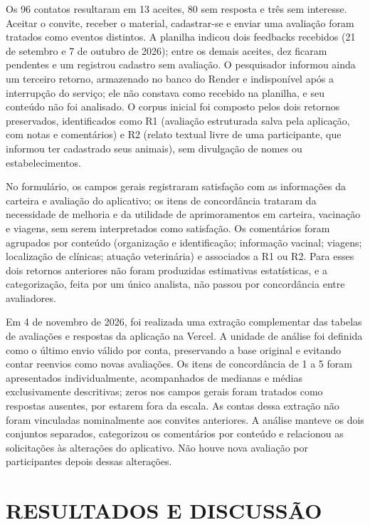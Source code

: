 \documentclass{UNESC}
\begin{document}
Os 96 contatos resultaram em 13 aceites, 80 sem resposta e três sem interesse. Aceitar o convite, receber o material, cadastrar-se e enviar uma avaliação foram tratados como eventos distintos. A planilha indicou dois feedbacks recebidos (21 de setembro e 7 de outubro de 2026); entre os demais aceites, dez ficaram pendentes e um registrou cadastro sem avaliação. O pesquisador informou ainda um terceiro retorno, armazenado no banco do Render e indisponível após a interrupção do serviço; ele não constava como recebido na planilha, e seu conteúdo não foi analisado. O corpus inicial foi composto pelos dois retornos preservados, identificados como R1 (avaliação estruturada salva pela aplicação, com notas e comentários) e R2 (relato textual livre de uma participante, que informou ter cadastrado seus animais), sem divulgação de nomes ou estabelecimentos.

No formulário, os campos gerais registraram satisfação com as informações da carteira e avaliação do aplicativo; os itens de concordância trataram da necessidade de melhoria e da utilidade de aprimoramentos em carteira, vacinação e viagens, sem serem interpretados como satisfação. Os comentários foram agrupados por conteúdo (organização e identificação; informação vacinal; viagens; localização de clínicas; atuação veterinária) e associados a R1 ou R2. Para esses dois retornos anteriores não foram produzidas estimativas estatísticas, e a categorização, feita por um único analista, não passou por concordância entre avaliadores.

Em 4 de novembro de 2026, foi realizada uma extração complementar das tabelas de avaliações e respostas da aplicação na Vercel. A unidade de análise foi definida como o último envio válido por conta, preservando a base original e evitando contar reenvios como novas avaliações. Os itens de concordância de 1 a 5 foram apresentados individualmente, acompanhados de medianas e médias exclusivamente descritivas; zeros nos campos gerais foram tratados como respostas ausentes, por estarem fora da escala. As contas dessa extração não foram vinculadas nominalmente aos convites anteriores. A análise manteve os dois conjuntos separados, categorizou os comentários por conteúdo e relacionou as solicitações às alterações do aplicativo. Não houve nova avaliação por participantes depois dessas alterações.

\section{RESULTADOS E DISCUSSÃO}
\end{document}
